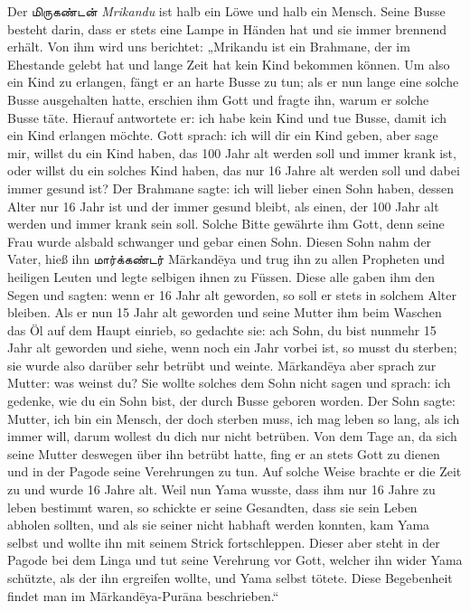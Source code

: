 \documentclass{article}
\newcommand{\TamilText}[1]{\texttamil{#1}}
\newcommand{\tam}[1]{\TamilText{#1}}
\begin{document}
Der \tam{மிருகண்டன்} \emph{Mrikandu} ist halb ein Löwe und halb ein Mensch. Seine Busse besteht darin, dass er stets eine Lampe in Händen hat und sie immer brennend erhält. Von ihm wird uns berichtet: „Mrikandu ist ein Brahmane, der im Ehestande gelebt hat und lange Zeit hat kein Kind bekommen können. Um also ein Kind zu erlangen, fängt er an harte Busse zu tun; als er nun lange eine solche Busse ausgehalten hatte, erschien ihm Gott und fragte ihn, warum er solche Busse täte. Hierauf antwortete er: ich habe kein Kind und tue Busse, damit ich ein Kind erlangen möchte. Gott sprach: ich will dir ein Kind geben, aber sage mir, willst du ein Kind haben, das 100 Jahr alt werden soll und immer krank ist, oder willst du ein solches Kind haben, das nur 16 Jahre alt werden soll und dabei immer gesund ist? Der Brahmane sagte: ich will lieber einen Sohn haben, dessen Alter nur 16 Jahr ist und der immer gesund bleibt, als einen, der 100 Jahr alt werden und immer krank sein soll. Solche Bitte gewährte ihm Gott, denn seine Frau wurde alsbald schwanger und gebar einen Sohn. Diesen Sohn nahm der Vater, hieß ihn \tam{மார்க்கண்டர்} M\={a}rkand\={e}ya und trug ihn zu allen Propheten und heiligen Leuten und legte selbigen ihnen zu Füssen. Diese alle gaben ihm den Segen und sagten: wenn er 16 Jahr alt geworden, so soll er stets in solchem Alter bleiben. Als er nun 15 Jahr alt geworden und seine Mutter ihm beim Waschen das Öl auf dem Haupt einrieb, so gedachte sie: ach Sohn, du bist nunmehr 15 Jahr alt geworden und siehe, wenn noch ein Jahr vorbei ist, so musst du sterben; sie wurde also darüber sehr betrübt und weinte. M\={a}rkand\={e}ya aber sprach zur Mutter: was weinst du? Sie wollte solches dem Sohn nicht sagen und sprach: ich gedenke, wie du ein Sohn bist, der durch Busse geboren worden. Der Sohn sagte: Mutter, ich bin ein Mensch, der doch sterben muss, ich mag leben so lang, als ich immer will, darum wollest du dich nur nicht betrüben. Von dem Tage an, da sich seine Mutter deswegen über ihn betrübt hatte, fing er an stets Gott zu dienen und in der Pagode seine Verehrungen zu tun. Auf solche Weise brachte er die Zeit zu und wurde 16 Jahre alt. Weil nun Yama wusste, dass ihm nur 16 Jahre zu leben bestimmt waren, so schickte er seine Gesandten, dass sie sein Leben abholen sollten, und als sie seiner nicht habhaft werden konnten, kam Yama selbst und wollte ihn mit seinem Strick fortschleppen. Dieser aber steht in der Pagode bei dem Linga und tut seine Verehrung vor Gott, welcher ihn wider Yama schützte, als der ihn ergreifen wollte, und Yama selbst tötete. Diese Begebenheit findet man im M\={a}rkand\={e}ya-Pur\={a}na beschrieben.“
\end{document}
